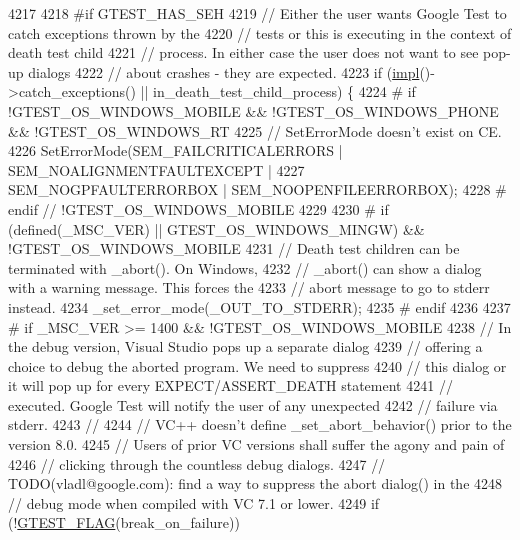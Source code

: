 \begin{DoxyCode}
4217 
4218 \textcolor{preprocessor}{#if GTEST\_HAS\_SEH}
4219   \textcolor{comment}{// Either the user wants Google Test to catch exceptions thrown by the}
4220   \textcolor{comment}{// tests or this is executing in the context of death test child}
4221   \textcolor{comment}{// process. In either case the user does not want to see pop-up dialogs}
4222   \textcolor{comment}{// about crashes - they are expected.}
4223   \textcolor{keywordflow}{if} (\hyperlink{classtesting_1_1UnitTest_a4df5d11a58affb337d7fa62eaa07690e}{impl}()->catch\_exceptions() || in\_death\_test\_child\_process) \{
4224 \textcolor{preprocessor}{# if !GTEST\_OS\_WINDOWS\_MOBILE && !GTEST\_OS\_WINDOWS\_PHONE && !GTEST\_OS\_WINDOWS\_RT}
4225     \textcolor{comment}{// SetErrorMode doesn't exist on CE.}
4226     SetErrorMode(SEM\_FAILCRITICALERRORS | SEM\_NOALIGNMENTFAULTEXCEPT |
4227                  SEM\_NOGPFAULTERRORBOX | SEM\_NOOPENFILEERRORBOX);
4228 \textcolor{preprocessor}{# endif  // !GTEST\_OS\_WINDOWS\_MOBILE}
4229 
4230 \textcolor{preprocessor}{# if (defined(\_MSC\_VER) || GTEST\_OS\_WINDOWS\_MINGW) && !GTEST\_OS\_WINDOWS\_MOBILE}
4231     \textcolor{comment}{// Death test children can be terminated with \_abort().  On Windows,}
4232     \textcolor{comment}{// \_abort() can show a dialog with a warning message.  This forces the}
4233     \textcolor{comment}{// abort message to go to stderr instead.}
4234     \_set\_error\_mode(\_OUT\_TO\_STDERR);
4235 \textcolor{preprocessor}{# endif}
4236 
4237 \textcolor{preprocessor}{# if \_MSC\_VER >= 1400 && !GTEST\_OS\_WINDOWS\_MOBILE}
4238     \textcolor{comment}{// In the debug version, Visual Studio pops up a separate dialog}
4239     \textcolor{comment}{// offering a choice to debug the aborted program. We need to suppress}
4240     \textcolor{comment}{// this dialog or it will pop up for every EXPECT/ASSERT\_DEATH statement}
4241     \textcolor{comment}{// executed. Google Test will notify the user of any unexpected}
4242     \textcolor{comment}{// failure via stderr.}
4243     \textcolor{comment}{//}
4244     \textcolor{comment}{// VC++ doesn't define \_set\_abort\_behavior() prior to the version 8.0.}
4245     \textcolor{comment}{// Users of prior VC versions shall suffer the agony and pain of}
4246     \textcolor{comment}{// clicking through the countless debug dialogs.}
4247     \textcolor{comment}{// TODO(vladl@google.com): find a way to suppress the abort dialog() in the}
4248     \textcolor{comment}{// debug mode when compiled with VC 7.1 or lower.}
4249     \textcolor{keywordflow}{if} (!\hyperlink{gtest-port_8h_a828f4e34a1c4b510da50ec1563e3562a}{GTEST\_FLAG}(break\_on\_failure))

\end{DoxyCode}
